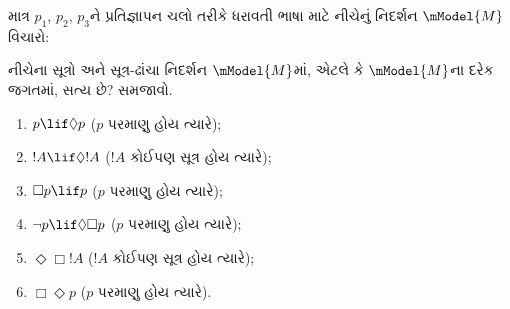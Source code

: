 \begin{prob}
  માત્ર $p_1$, $p_2$, $p_3$ને પ્રતિજ્ઞાપન ચલો તરીકે
  ધરાવતી ભાષા માટે નીચેનું નિદર્શન $\mModel{M}$ વિચારો:
  \begin{center}
  \end{center}
  નીચેના સૂત્રો અને સૂત્ર-ઢાંચા નિદર્શન
  $\mModel{M}$માં, એટલે કે $\mModel{M}$ના દરેક જગતમાં, સત્ય છે?
  સમજાવો.
  \begin{enumerate}
  \item $p\lif \Diamond p$ ($p$ પરમાણુ હોય ત્યારે);
  \item $!A\lif \Diamond !A$ ($!A$ કોઈપણ સૂત્ર હોય ત્યારે);
  \item $\Box p \lif p$ ($p$ પરમાણુ હોય ત્યારે);
  \item $\lnot p \lif \Diamond \Box p$ ($p$ પરમાણુ હોય ત્યારે);
  \item $\Diamond \Box !A$ ($!A$ કોઈપણ સૂત્ર હોય ત્યારે);
  \item $\Box \Diamond p$ ($p$ પરમાણુ હોય ત્યારે).
  \end{enumerate}
\end{prob}
\endgroup

\begingroup
\makeatletter{}\makeatother


\label{guunit:OLP-0415}


